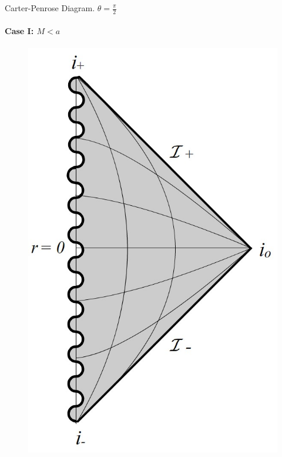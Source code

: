 \documentclass{beamer}
\begin{document}
        
        \begin{frame}{Carter-Penrose Diagram. $\theta=\frac{\pi}{2}$}
        \framesubtitle{Case I: $M<a$}
        	\begin{center}
				\begin{figure}
				\includegraphics[scale=0.75] {figures/fig36.jpg}
				\end{figure}
			\end{center}	
        \end{frame}
        
\end{document}
